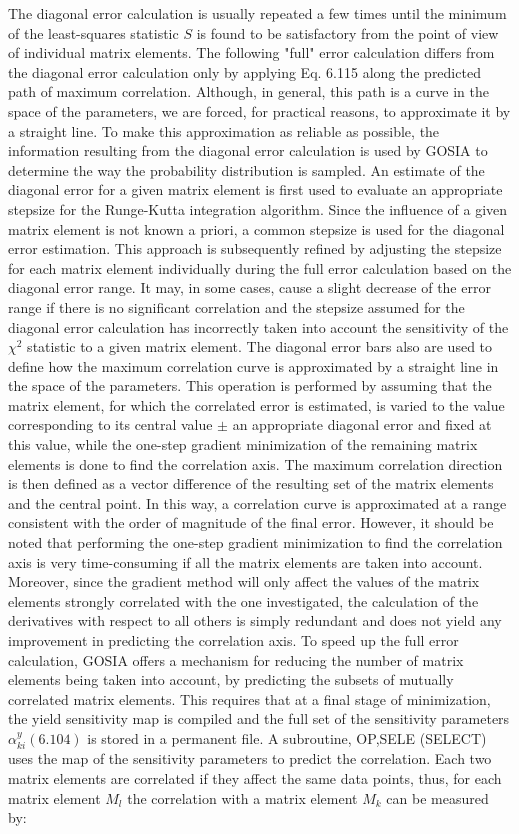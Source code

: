 \documentclass[10pt]{article}
\begin{document}
The diagonal error calculation is usually repeated a few times until the minimum of the least-squares statistic $S$ is found to be satisfactory from the point of view of individual matrix elements. The following "full" error calculation differs from the diagonal error calculation only by applying Eq. 6.115 along the predicted path of maximum correlation. Although, in general, this path is a curve in the space of the parameters, we are forced, for practical reasons, to approximate it by a straight line. To make this approximation as reliable as possible, the information resulting from the diagonal error calculation is used by GOSIA to determine the way the probability distribution is sampled. An estimate of the diagonal error for a given matrix element is first used to evaluate an appropriate stepsize for the Runge-Kutta integration algorithm. Since the influence of a given matrix element is not known a priori, a common stepsize is used for the diagonal error estimation. This approach is subsequently refined by adjusting the stepsize for each matrix element individually during the full error calculation based on the diagonal error range. It may, in some cases, cause a slight decrease of the error range if there is no significant correlation and the stepsize assumed for the diagonal error calculation has incorrectly taken into account the sensitivity of the $\chi^{2}$ statistic to a given matrix element. The diagonal error bars also are used to define how the maximum correlation curve is approximated by a straight line in the space of the parameters. This operation is performed by assuming that the matrix element, for which the correlated error is estimated, is varied to the value corresponding to its central value $\pm$ an appropriate diagonal error and fixed at this value, while the one-step gradient minimization of the remaining matrix elements is done to find the correlation axis. The maximum correlation direction is then defined as a vector difference of the resulting set of the matrix elements and the central point. In this way, a correlation curve is approximated at a range consistent with the order of magnitude of the final error. However, it should be noted that performing the one-step gradient minimization to find the correlation axis is very time-consuming if all the matrix elements are taken into account. Moreover, since the gradient method will only affect the values of the matrix elements strongly correlated with the one investigated, the calculation of the derivatives with respect to all others is simply redundant and does not yield any improvement in predicting the correlation axis. To speed up the full error calculation, GOSIA offers a mechanism for reducing the number of matrix elements being taken into account, by predicting the subsets of mutually correlated matrix elements. This requires that at a final stage of minimization, the yield sensitivity map is compiled and the full set of the sensitivity parameters $\alpha_{k i}^{y}(6.104)$ is stored in a permanent file. A subroutine, OP,SELE (SELECT) uses the map of the sensitivity parameters to predict the correlation. Each two matrix elements are correlated if they affect the same data points, thus, for each matrix element $M_{l}$ the correlation with a matrix element $M_{k}$ can be measured by:
\end{document}
